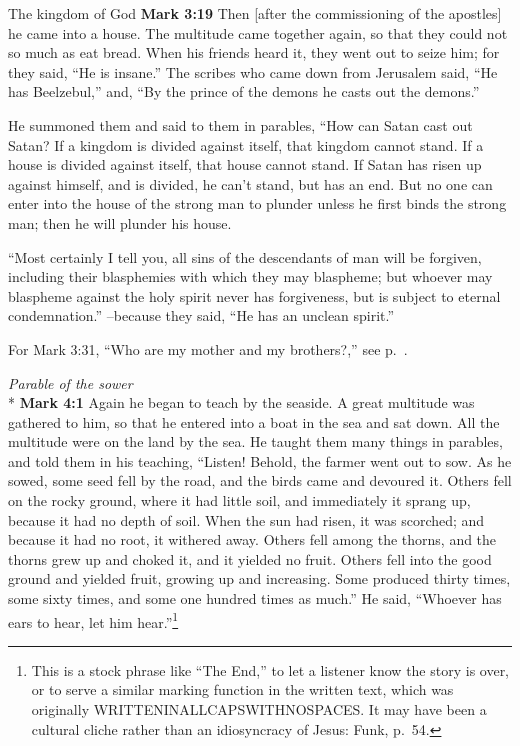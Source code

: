 \documentclass[10pt,twoside]{article} %
\newcommand{\doimage}[2]{\texttt{[image: \#2]}\label{fig:#2}}
\newcommand{\figbasic}[4]{ %
    \ifthenelse{\isodd{\pageref{fig:#2}}}{}{\hfill}
    \ifstrempty{#3}{
      \doimage{#1}{#2}
    }{
      \makebox{\doimage{#1}{#2} \\ #3}
    }
    \ifthenelse{\isodd{\pageref{fig:#2}}}{\hfill}{}
    \par
}
\newcommand{\fig}[2][0.4]{
  \figbasic{#1}{#2}{}{}
}
\newcommand{\quotesize}{\normalsize{}}
\newcommand{\comm}[1]{\begingroup \color{black!50} #1\endgroup}
\newenvironment{quotetext}{\begingroup\quotesize}{\endgroup}
\newcommand{\intex}[1]{\index[texts]{#1}}
\newcommand{\bible}[2]{\begin{quotetext}\textbf{#1}\intex{#1} #2\end{quotetext}}
\newcommand{\gospelmark}[2]{\bible{Mark #1}{#2}}
\newcommand{\subhead}[1]{\emph{#1}\\*}
\begin{document}
\begin{section}{The kingdom of God}
\gospelmark{3:19}{
Then [after the commissioning of the apostles] he came into a house.   The multitude came together again, so that they could not so much as eat bread.   When his friends heard it, they went out to seize him; for they said, ``He is insane.''   The scribes who came down from Jerusalem said, ``He has Beelzebul,'' and, ``By the prince of the demons he casts out the demons.''

  He summoned them and said to them in parables, ``How can Satan cast out Satan?    If a kingdom is divided against itself, that kingdom cannot stand.    If a house is divided against itself, that house cannot stand.    If Satan has risen up against himself, and is divided, he can't stand, but has an end.    But no one can enter into the house of the strong man to plunder unless he first binds the strong man; then he will plunder his house.

   ``Most certainly I tell you, all sins of the descendants of man will be forgiven, including their blasphemies with which they may blaspheme;    but whoever may blaspheme against the holy spirit never has forgiveness, but is subject to eternal condemnation.''   --because they said, ``He has an unclean spirit.''\label{how-can-satan}
}

\comm{For Mark 3:31, ``Who are my mother and my brothers?,'' see p.~\pageref{who-are-my-mother-and-my-brothers}.}

\fig{sower}

\subhead{Parable of the sower}
\gospelmark{4:1}{
   Again he began to teach by the seaside. A great multitude was gathered to him, so that he entered into a boat in the sea and sat down. All the multitude were on the land by the sea.   He taught them many things in parables, and told them in his teaching,    ``Listen! Behold, the farmer went out to sow.    As he sowed, some seed fell by the road, and the birds came and devoured it.    Others fell on the rocky ground, where it had little soil, and immediately it sprang up, because it had no depth of soil.    When the sun had risen, it was scorched; and because it had no root, it withered away.    Others fell among the thorns, and the thorns grew up and choked it, and it yielded no fruit.    Others fell into the good ground and yielded fruit, growing up and increasing. Some produced thirty times, some sixty times, and some one hundred times as much.''   
He said, ``Whoever has ears to hear, let him hear.''\footnote{This is a stock phrase like ``The End,'' to let a listener know the story
is over, or to serve a similar marking function in the written text, which was originally WRITTENINALLCAPSWITHNOSPACES. It may have been
a cultural cliche rather than an idiosyncracy of Jesus: Funk, p.~54.}

}
\end{section}
\end{document}
